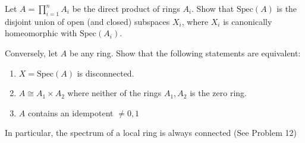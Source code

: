 \documentclass{solution}
\begin{document}
\begin{problem}
    Let $A = \prod\limits_{i = 1}^{n} A_i$ be the direct product of rings $A_i$. Show that $\mathrm{Spec}(A)$ is the disjoint union of open (and closed) subspaces $X_i$, where $X_i$ is canonically homeomorphic with $\mathrm{Spec}(A_i)$.

    Conversely, let $A$ be any ring. Show that the following statements are equivalent:
    \begin{enumerate}
        \item $X = \mathrm{Spec}(A)$ is disconnected.
        \item $A \cong A_1 \times A_2$ where neither of the rings $A_1, A_2$ is the zero ring.
        \item $A$ contains an idempotent $\ne 0, 1$
    \end{enumerate}

    In particular, the spectrum of a local ring is always connected (See Problem 12)
\end{problem}
\end{document}
